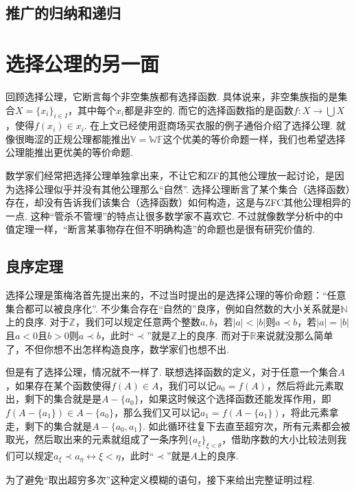 \documentclass[main.tex]{subfiles}
\begin{document}
\subsection{推广的归纳和递归}

\section{选择公理的另一面}

回顾选择公理，它断言每个非空集族都有选择函数. 具体说来，非空集族指的是集合\(X = \{x_i\}_{i \in I}\)，其中每个\(x_i\)都是非空的. 而它的选择函数指的是函数\(f:X \to \bigcup X\)，使得\(f(x_i) \in x_i\). 在上文已经使用逛商场买衣服的例子通俗介绍了选择公理. 就像很晦涩的正规公理都能推出\(\mathbb{V} = \mathbb{WF}\)这个优美的等价命题一样，我们也希望选择公理能推出更优美的等价命题.

数学家们经常把选择公理单独拿出来，不让它和\textsf{ZF}的其他公理放一起讨论，是因为选择公理似乎并没有其他公理那么“自然”. 选择公理断言了某个集合（选择函数）存在，却没有告诉我们该集合（选择函数）如何构造，这是与\textsf{ZFC}其他公理相异的一点. 这种“管杀不管埋”的特点让很多数学家不喜欢它. 不过就像数学分析中的中值定理一样，“断言某事物存在但不明确构造”的命题也是很有研究价值的. 

\subsection{良序定理}

选择公理是策梅洛首先提出来的，不过当时提出的是选择公理的等价命题：“任意集合都可以被良序化”. 不少集合存在“自然的”良序，例如自然数的大小关系就是\(\mathbb{N}\)上的良序. 对于\(\mathbb{Z}\)，我们可以规定任意两个整数\(a,b\)，若\(|a|<|b|\)则\(a \prec b\)，若\(|a| = |b|\)且\(a < 0\)且\(b>0\)则\(a \prec b\)，此时“\(\prec\)”就是\(\mathbb{Z}\)上的良序. 而对于\(\mathbb{R}\)来说就没那么简单了，不但你想不出怎样构造良序，数学家们也想不出. 

但是有了选择公理，情况就不一样了. 联想选择函数的定义，对于任意一个集合\(A\)，如果存在某个函数使得\(f(A) \in A\)，我们可以记\(a_0 = f(A)\)，然后将此元素取出，剩下的集合就是是\(A-\{a_0\}\)，如果这时候这个选择函数还能发挥作用，即\(f(A-\{a_1\}) \in A-\{a_0\}\)，那么我们又可以记\(a_1 = f(A-\{a_1\})\)，将此元素拿走，剩下的集合就是\(A - \{a_0,a_1\}\). 如此循环往复下去直至超穷次，所有元素都会被取光，然后取出来的元素就组成了一条序列\(\{a_\xi\}_{\xi < \theta}\)，借助序数的大小比较法则我们可以规定\(a_\xi \prec a_\eta \leftrightarrow \xi < \eta\)，此时“\(\prec\)”就是\(A\)上的良序.

为了避免“取出超穷多次”这种定义模糊的语句，接下来给出完整证明过程.
\end{document}
